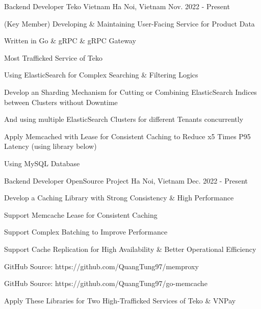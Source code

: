 


\begin{cventries}


\cventry
{Backend Developer} %
{Teko Vietnam} %
{Ha Noi, Vietnam} %
{Nov. 2022 - Present} %
{ %
\begin{cvitems}
\item{(Key Member) Developing \& Maintaining User-Facing Service for Product Data}
\item{Written in Go \& gRPC \& gRPC Gateway}
\item{Most Trafficked Service of Teko}
\item{Using ElasticSearch for Complex Searching \& Filtering Logics}
\item{Develop an Sharding Mechanism for Cutting or Combining ElasticSearch Indices between Clusters without Downtime} 
\item{And using multiple ElasticSearch Clusters for different Tenants concurrently} 
\item{Apply Memcached with Lease for Consistent Caching to Reduce x5 Times P95 Latency (using library below)}
\item{Using MySQL Database}
\end{cvitems}
}


\cventry
{Backend Developer} %
{OpenSource Project} %
{Ha Noi, Vietnam} %
{Dec. 2022 - Present} %
{ %
\begin{cvitems}
\item{Develop a Caching Library with Strong Consistency \& High Performance}
\item{Support Memcache Lease for Consistent Caching}
\item{Support Complex Batching to Improve Performance}
\item{Support Cache Replication for High Availability \& Better Operational Efficiency}
\item{GitHub Source: https://github.com/QuangTung97/memproxy}
\item{GitHub Source: https://github.com/QuangTung97/go-memcache}
\item{Apply These Libraries for Two High-Trafficked Services of Teko \& VNPay}
\end{cvitems}
}


\end{cventries}
